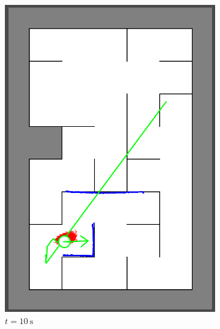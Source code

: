 \begin{figure}[H]
\begin{subfigure}{0.2\textwidth}
         \includegraphics[width=\textwidth]{figures/localization2_10s.png}
         \caption{$t = \SI{10}{\second}$}
         \label{mapping8s}
     \end{subfigure}
     \hspace{1em}
     \begin{subfigure}{0.2\textwidth}
         \centering

\end{subfigure}
\end{figure}
